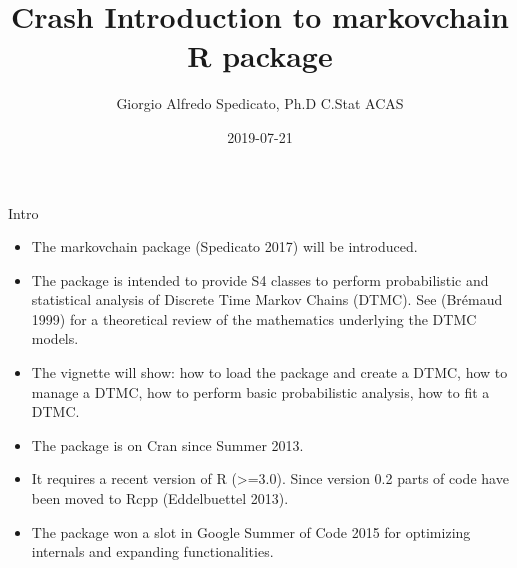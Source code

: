 \documentclass[ignorenonframetext,]{beamer}
\title{Crash Introduction to markovchain R package}
\author{Giorgio Alfredo Spedicato, Ph.D C.Stat ACAS}
\date{2019-07-21}
\providecommand{\tightlist}{%
  \setlength{\itemsep}{0pt}\setlength{\parskip}{0pt}}
\providecommand{\tightlist}{
  \setlength{\itemsep}{0pt}\setlength{\parskip}{0pt}
}
\begin{document}
\frame{\titlepage}

\begin{frame}
\tableofcontents[hideallsubsections]
\end{frame}
\begin{frame}

\end{frame}

\begin{frame}{Intro}
\protect\hypertarget{intro}{}

\begin{itemize}
\tightlist
\item
  The markovchain package (Spedicato 2017) will be introduced.
\item
  The package is intended to provide S4 classes to perform probabilistic
  and statistical analysis of Discrete Time Markov Chains (DTMC). See
  (Brémaud 1999) for a theoretical review of the mathematics underlying
  the DTMC models.
\item
  The vignette will show: how to load the package and create a DTMC, how
  to manage a DTMC, how to perform basic probabilistic analysis, how to
  fit a DTMC.
\end{itemize}

\end{frame}

\begin{frame}

\begin{itemize}
\tightlist
\item
  The package is on Cran since Summer 2013.
\item
  It requires a recent version of R (\textgreater{}=3.0). Since version
  0.2 parts of code have been moved to Rcpp (Eddelbuettel 2013).
\item
  The package won a slot in Google Summer of Code 2015 for optimizing
  internals and expanding functionalities.
\end{itemize}

\end{frame}
\end{document}
